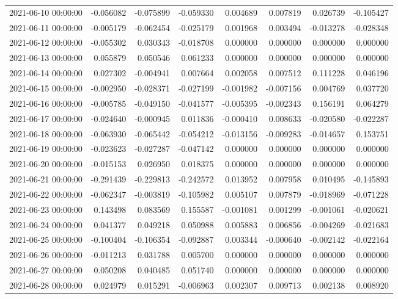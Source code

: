 \begin{tabular}{lrrrrrrr}
2021-06-10 00:00:00 & -0.056082 & -0.075899 & -0.059330 & 0.004689 & 0.007819 & 0.026739 & -0.105427 \\
2021-06-11 00:00:00 & -0.005179 & -0.062454 & -0.025179 & 0.001968 & 0.003494 & -0.013278 & -0.028348 \\
2021-06-12 00:00:00 & -0.055302 & 0.030343 & -0.018708 & 0.000000 & 0.000000 & 0.000000 & 0.000000 \\
2021-06-13 00:00:00 & 0.055879 & 0.050546 & 0.061233 & 0.000000 & 0.000000 & 0.000000 & 0.000000 \\
2021-06-14 00:00:00 & 0.027302 & -0.004941 & 0.007664 & 0.002058 & 0.007512 & 0.111228 & 0.046196 \\
2021-06-15 00:00:00 & -0.002950 & -0.028371 & -0.027199 & -0.001982 & -0.007156 & 0.004769 & 0.037720 \\
2021-06-16 00:00:00 & -0.005785 & -0.049150 & -0.041577 & -0.005395 & -0.002343 & 0.156191 & 0.064279 \\
2021-06-17 00:00:00 & -0.024640 & -0.000945 & 0.011836 & -0.000410 & 0.008633 & -0.020580 & -0.022287 \\
2021-06-18 00:00:00 & -0.063930 & -0.065442 & -0.054212 & -0.013156 & -0.009283 & -0.014657 & 0.153751 \\
2021-06-19 00:00:00 & -0.023623 & -0.027287 & -0.047142 & 0.000000 & 0.000000 & 0.000000 & 0.000000 \\
2021-06-20 00:00:00 & -0.015153 & 0.026950 & 0.018375 & 0.000000 & 0.000000 & 0.000000 & 0.000000 \\
2021-06-21 00:00:00 & -0.291439 & -0.229813 & -0.242572 & 0.013952 & 0.007958 & 0.010495 & -0.145893 \\
2021-06-22 00:00:00 & -0.062347 & -0.003819 & -0.105982 & 0.005107 & 0.007879 & -0.018969 & -0.071228 \\
2021-06-23 00:00:00 & 0.143498 & 0.083569 & 0.155587 & -0.001081 & 0.001299 & -0.001061 & -0.020621 \\
2021-06-24 00:00:00 & 0.041377 & 0.049218 & 0.050988 & 0.005883 & 0.006856 & -0.004269 & -0.021683 \\
2021-06-25 00:00:00 & -0.100404 & -0.106354 & -0.092887 & 0.003344 & -0.000640 & -0.002142 & -0.022164 \\
2021-06-26 00:00:00 & -0.011213 & 0.031788 & 0.005700 & 0.000000 & 0.000000 & 0.000000 & 0.000000 \\
2021-06-27 00:00:00 & 0.050208 & 0.040485 & 0.051740 & 0.000000 & 0.000000 & 0.000000 & 0.000000 \\
2021-06-28 00:00:00 & 0.024979 & 0.015291 & -0.006963 & 0.002307 & 0.009713 & 0.002138 & 0.008920 \\

\end{tabular}
